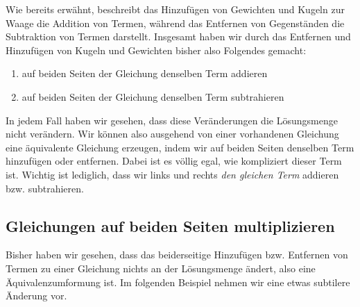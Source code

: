\documentclass[../../main.tex]{subfiles}
\begin{document}
Wie bereits erwähnt, beschreibt das Hinzufügen von Gewichten und Kugeln zur Waage die Addition von Termen, während das Entfernen von Gegenständen die Subtraktion von Termen darstellt. Insgesamt haben wir durch das Entfernen und Hinzufügen von Kugeln und Gewichten bisher also Folgendes gemacht:
\begin{enumerate}
    \item auf beiden Seiten der Gleichung denselben Term addieren
    \item auf beiden Seiten der Gleichung denselben Term subtrahieren
\end{enumerate}

In jedem Fall haben wir gesehen, dass diese Veränderungen die Lösungsmenge nicht verändern. Wir können also ausgehend von einer vorhandenen Gleichung eine äquivalente Gleichung erzeugen, indem wir auf beiden Seiten denselben Term hinzufügen oder entfernen. Dabei ist es völlig egal, wie kompliziert dieser Term ist. Wichtig ist lediglich, dass wir links und rechts \emph{den gleichen Term} addieren bzw. subtrahieren.

\subsection{Gleichungen auf beiden Seiten multiplizieren}

Bisher haben wir gesehen, dass das beiderseitige Hinzufügen bzw. Entfernen von Termen zu einer Gleichung nichts an der Lösungsmenge ändert, also eine Äquivalenzumformung ist. Im folgenden Beispiel nehmen wir eine etwas subtilere Änderung vor.
\end{document}
